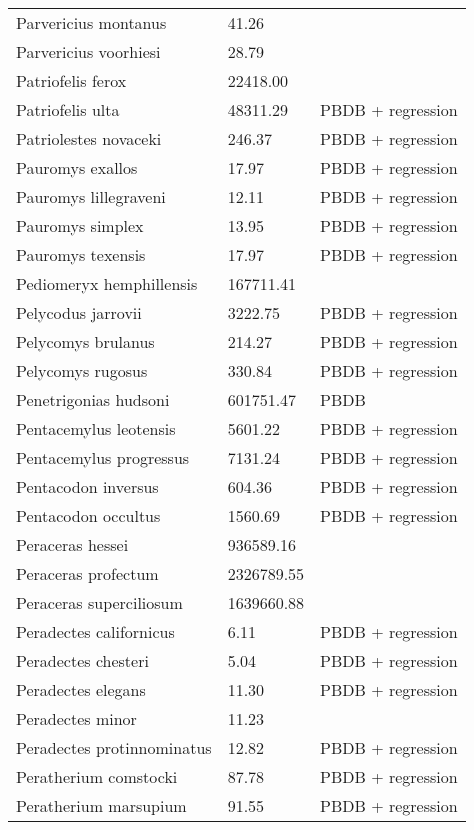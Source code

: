 \documentclass{article}
\begin{document}
\begin{center}
\begin{longtable}{p{} p{} p{} }
  Parvericius montanus & 41.26 & \cite{Tomiya2013} \\ 
  Parvericius voorhiesi & 28.79 & \cite{Tomiya2013} \\ 
  Patriofelis ferox & 22418.00 & \cite{McKenna2011} \\ 
  Patriofelis ulta & 48311.29 & PBDB + regression \\ 
  Patriolestes novaceki & 246.37 & PBDB + regression \\ 
  Pauromys exallos & 17.97 & PBDB + regression \\ 
  Pauromys lillegraveni & 12.11 & PBDB + regression \\ 
  Pauromys simplex & 13.95 & PBDB + regression \\ 
  Pauromys texensis & 17.97 & PBDB + regression \\ 
  Pediomeryx hemphillensis & 167711.41 & \cite{Tomiya2013} \\ 
  Pelycodus jarrovii & 3222.75 & PBDB + regression \\ 
  Pelycomys brulanus & 214.27 & PBDB + regression \\ 
  Pelycomys rugosus & 330.84 & PBDB + regression \\ 
  Penetrigonias hudsoni & 601751.47 & PBDB \\ 
  Pentacemylus leotensis & 5601.22 & PBDB + regression \\ 
  Pentacemylus progressus & 7131.24 & PBDB + regression \\ 
  Pentacodon inversus & 604.36 & PBDB + regression \\ 
  Pentacodon occultus & 1560.69 & PBDB + regression \\ 
  Peraceras hessei & 936589.16 & \cite{Tomiya2013} \\ 
  Peraceras profectum & 2326789.55 & \cite{Tomiya2013} \\ 
  Peraceras superciliosum & 1639660.88 & \cite{Tomiya2013} \\ 
  Peradectes californicus & 6.11 & PBDB + regression \\ 
  Peradectes chesteri & 5.04 & PBDB + regression \\ 
  Peradectes elegans & 11.30 & PBDB + regression \\ 
  Peradectes minor & 11.23 & \cite{Taylor1976} \\ 
  Peradectes protinnominatus & 12.82 & PBDB + regression \\ 
  Peratherium comstocki & 87.78 & PBDB + regression \\ 
  Peratherium marsupium & 91.55 & PBDB + regression \\ 

\end{longtable}
\end{center}
\end{document}
